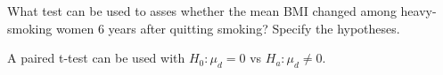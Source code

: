 What test can be used to asses whether the mean BMI changed among heavy-smoking
women 6 years after quitting smoking? Specify the hypotheses.

\soln* A paired t-test can be used with $H_0 : \mu_d = 0$ vs $H_a : \mu_d \neq 0$.